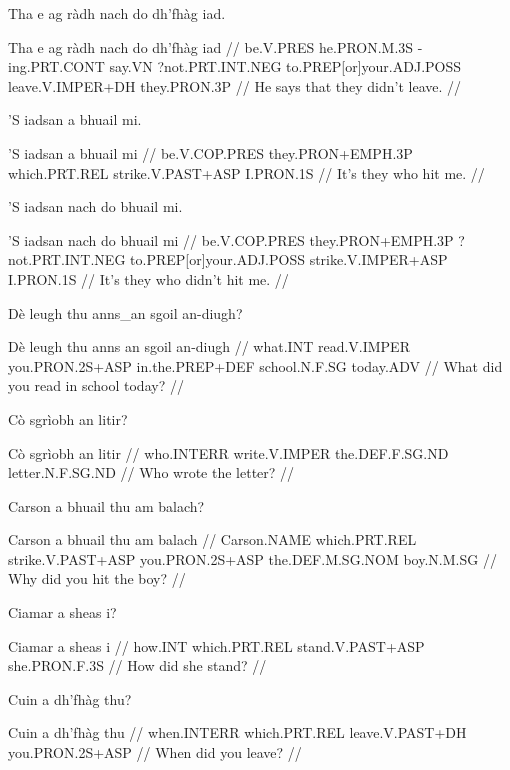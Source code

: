 \documentclass[a4paper,10pt]{article}
\begin{document}
\ex
\begingl
\glpre Tha e ag ràdh nach do dh'fhàg iad. 

\vspace{4mm}
\gla Tha e ag ràdh nach do dh'fhàg iad  //
\glb be.V.PRES he.PRON.M.3S -ing.PRT.CONT say.VN ?not.PRT.INT.NEG to.PREP[or]your.ADJ.POSS leave.V.IMPER+DH they.PRON.3P  //
\glft He says that they didn't leave. //
\endgl
\xe

\ex
\begingl
\glpre 'S iadsan a bhuail mi. 

\vspace{4mm}
\gla 'S iadsan a bhuail mi  //
\glb be.V.COP.PRES they.PRON+EMPH.3P which.PRT.REL strike.V.PAST+ASP I.PRON.1S  //
\glft It's they who hit me. //
\endgl
\xe

\ex
\begingl
\glpre 'S iadsan nach do bhuail mi. 

\vspace{4mm}
\gla 'S iadsan nach do bhuail mi  //
\glb be.V.COP.PRES they.PRON+EMPH.3P ?not.PRT.INT.NEG to.PREP[or]your.ADJ.POSS strike.V.IMPER+ASP I.PRON.1S  //
\glft It's they who didn't hit me. //
\endgl
\xe

\ex
\begingl
\glpre Dè leugh thu anns\_an sgoil an-diugh? 

\vspace{4mm}
\gla Dè leugh thu {anns an} sgoil an-diugh  //
\glb what.INT read.V.IMPER you.PRON.2S+ASP in.the.PREP+DEF school.N.F.SG today.ADV  //
\glft What did you read in school today? //
\endgl
\xe

\ex
\begingl
\glpre Cò sgrìobh an litir? 

\vspace{4mm}
\gla Cò sgrìobh an litir  //
\glb who.INTERR write.V.IMPER the.DEF.F.SG.ND letter.N.F.SG.ND  //
\glft Who wrote the letter? //
\endgl
\xe

\ex
\begingl
\glpre Carson a bhuail thu am balach? 

\vspace{4mm}
\gla Carson a bhuail thu am balach  //
\glb Carson.NAME which.PRT.REL strike.V.PAST+ASP you.PRON.2S+ASP the.DEF.M.SG.NOM boy.N.M.SG  //
\glft Why did you hit the boy? //
\endgl
\xe

\ex
\begingl
\glpre Ciamar a sheas i? 

\vspace{4mm}
\gla Ciamar a sheas i  //
\glb how.INT which.PRT.REL stand.V.PAST+ASP she.PRON.F.3S  //
\glft How did she stand? //
\endgl
\xe

\ex
\begingl
\glpre Cuin a dh'fhàg thu? 

\vspace{4mm}
\gla Cuin a dh'fhàg thu  //
\glb when.INTERR which.PRT.REL leave.V.PAST+DH you.PRON.2S+ASP  //
\glft When did you leave? //
\endgl
\xe
\end{document}
